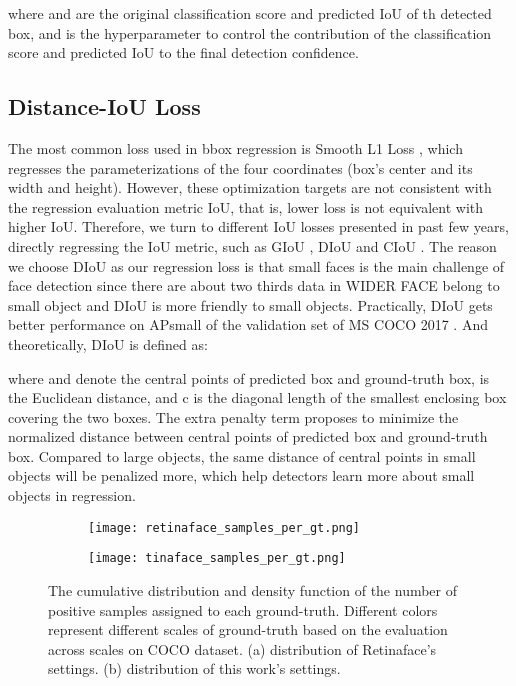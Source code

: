 \documentclass[final]{cvpr}
\begin{document}
where  and  are the original classification score and predicted IoU of th detected box, and  is the hyperparameter to control the contribution of the classification score and predicted IoU to the final detection confidence. 

\subsection{Distance-IoU Loss}
\label{sec3:sub4}
The most common loss used in bbox regression is Smooth L1 Loss \cite{girshick2015fast} , which regresses the parameterizations of the four coordinates (box's center and its width and height). However, these optimization targets are not consistent with the regression evaluation metric IoU, that is, lower loss is not equivalent with higher IoU. Therefore, we turn to different IoU losses presented in past few years, directly regressing the IoU metric, such as GIoU \cite{rezatofighi2019generalized}, DIoU and CIoU \cite{zheng2020distance}. The reason we choose DIoU \cite{zheng2020distance} as our regression loss is that  small faces is the main challenge of face detection since there are about two thirds data in WIDER FACE \cite{yang2016wider} belong to small object and DIoU \cite{zheng2020distance} is more friendly to small objects. Practically, DIoU gets better performance on APsmall of the validation set of MS COCO 2017 \cite{lin2014microsoft}. And theoretically, DIoU is defined as: 

where  and  denote the central points of predicted box and ground-truth box,  is the Euclidean distance, and c is the diagonal length of the smallest enclosing box covering the two boxes. The extra penalty term  proposes to minimize the normalized distance between central points of predicted box and ground-truth box. Compared to large objects, the same distance of central points in small objects will be penalized more, which help detectors learn more about small objects in regression.

\begin{figure*}[ht]
\centering                                                                               
\begin{subfigure}{.5\textwidth}
  \centering
  \texttt{[image: retinaface\_samples\_per\_gt.png]}
  \caption{}
  \label{fig2:sub1}
\end{subfigure}\begin{subfigure}{.5\textwidth}
  \centering
  \texttt{[image: tinaface\_samples\_per\_gt.png]}
  \caption{}
  \label{fig2:sub2}
\end{subfigure}
\caption{The cumulative distribution and density function of the number of positive samples assigned to each ground-truth. Different colors represent different scales of ground-truth based on the evaluation across scales on COCO dataset. (a) distribution of Retinaface's \cite{deng2019retinaface} settings. (b) distribution of this work's settings. }
\label{fig:fig2}
\end{figure*}
\end{document}
